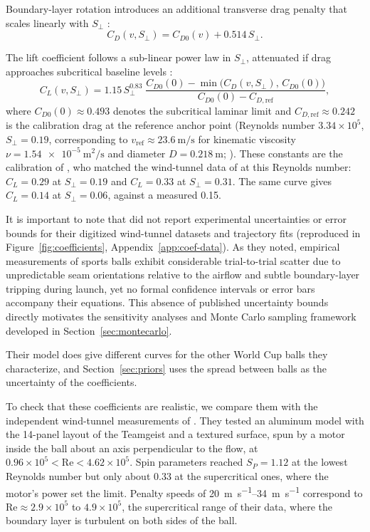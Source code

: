\documentclass[10pt,a4paper]{article}
\begin{document}
Boundary-layer rotation introduces an additional transverse drag penalty that
scales linearly with $S_\perp$ \citep[Eq.~7]{kiratidis2018}:
\begin{equation}
  C_D(v, S_\perp) = C_{D0}(v) + 0.514\, S_\perp .
  \label{eq:cd}
\end{equation}

The lift coefficient follows a sub-linear power law in $S_\perp$, attenuated if
drag approaches subcritical baseline levels \citep[Eqs.~8--9]{kiratidis2018}:
\begin{equation}
  C_L(v, S_\perp) = 1.15\, S_\perp^{0.83}\;
  \frac{C_{D0}(0) - \min\!\big(C_D(v, S_\perp),\, C_{D0}(0)\big)}
       {C_{D0}(0) - C_{D,\mathrm{ref}}},
  \label{eq:cl}
\end{equation}
where $C_{D0}(0) \approx 0.493$ denotes the subcritical laminar limit and
$C_{D,\mathrm{ref}} \approx 0.242$ is the calibration drag at the reference
anchor point (Reynolds number $3.34\times10^5$, $S_\perp = 0.19$, corresponding
to $v_{\mathrm{ref}} \approx \SI{23.6}{\metre\per\second}$ for kinematic
viscosity $\nu = \SI{1.54e-5}{\metre\squared\per\second}$ and diameter
$D = \SI{0.218}{\metre}$; \citealp{goff2010}). These constants are the calibration
of \citet{kiratidis2018}, who matched the wind-tunnel data of \citet{asai2007} at
this Reynolds number: $C_L = 0.29$ at $S_\perp = 0.19$ and $C_L = 0.33$ at
$S_\perp = 0.31$. The same curve gives $C_L = 0.14$ at $S_\perp = 0.06$, against a
measured 0.15.

It is important to note that \citet{kiratidis2018} did not report experimental
uncertainties or error bounds for their digitized wind-tunnel datasets and
trajectory fits (reproduced in Figure~\ref{fig:coefficients}, Appendix~\ref{app:coef-data}). As they noted,
empirical measurements of sports balls exhibit considerable trial-to-trial
scatter due to unpredictable seam orientations relative to the airflow and
subtle boundary-layer tripping during launch, yet no formal confidence intervals
or error bars accompany their equations. This absence of published uncertainty
bounds directly motivates the sensitivity analyses and Monte Carlo sampling
framework developed in Section~\ref{sec:montecarlo}.

Their model does give different curves for the other World Cup balls they
characterize, and Section~\ref{sec:priors} uses the spread between balls as
the uncertainty of the coefficients.

To check that these coefficients are realistic, we compare them with the
independent wind-tunnel measurements of \citet{kray2014}. They tested an
aluminum model with the 14-panel layout of the Teamgeist and a textured
surface, spun by a motor inside the ball about an axis perpendicular to the
flow, at $0.96\times10^5 < \mathrm{Re} < 4.62\times10^5$. Spin parameters reached
$S_P = 1.12$ at the lowest Reynolds number but only about 0.33 at the
supercritical ones, where the motor's power set the limit. Penalty speeds of
\SIrange{20}{34}{\metre\per\second} correspond to
$\mathrm{Re} \approx 2.9\times10^5$ to $4.9\times10^5$, the supercritical
range of their data, where the boundary layer is turbulent on both sides of
the ball.
\end{document}
